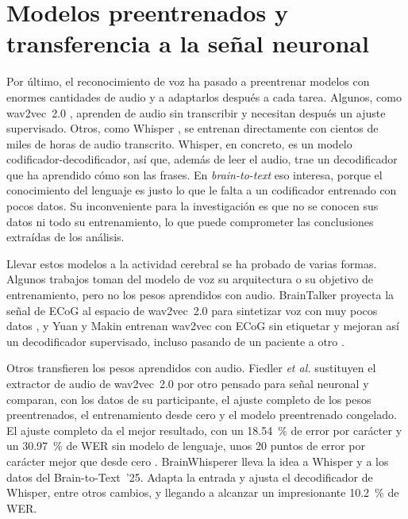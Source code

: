 \section{Modelos preentrenados y transferencia a la señal neuronal}
\label{sec:sota-habla}
\label{sec:sota-transferencia}

Por último, el reconocimiento de voz ha pasado a preentrenar modelos con enormes cantidades de audio y a adaptarlos después a cada tarea. Algunos, como wav2vec~2.0 \cite{baevski2020wav2vec}, aprenden de audio sin transcribir y necesitan después un ajuste supervisado. Otros, como Whisper \cite{radford2023whisper}, se entrenan directamente con cientos de miles de horas de audio transcrito. Whisper, en concreto, es un modelo codificador-decodificador, así que, además de leer el audio, trae un decodificador que ha aprendido cómo son las frases. En \textit{brain-to-text} eso interesa, porque el conocimiento del lenguaje es justo lo que le falta a un codificador entrenado con pocos datos. Su inconveniente para la investigación es que no se conocen sus datos ni todo su entrenamiento, lo que puede comprometer las conclusiones extraídas de los análisis. 


Llevar estos modelos a la actividad cerebral se ha probado de varias formas. Algunos trabajos toman del modelo de voz su arquitectura o su objetivo de entrenamiento, pero no los pesos aprendidos con audio. BrainTalker proyecta la señal de ECoG al espacio de wav2vec~2.0 para sintetizar voz con muy pocos datos \cite{braintalker}, y Yuan y Makin entrenan wav2vec con ECoG sin etiquetar y mejoran así un decodificador supervisado, incluso pasando de un paciente a otro \cite{ecogssl2024}.

Otros transfieren los pesos aprendidos con audio. Fiedler \textit{et al.} sustituyen el extractor de audio de wav2vec~2.0 por otro pensado para señal neuronal y comparan, con los datos de su participante, el ajuste completo de los pesos preentrenados, el entrenamiento desde cero y el modelo preentrenado congelado. El ajuste completo da el mejor resultado, con un \SI{18.54}{\percent} de error por carácter y un \SI{30.97}{\percent} de WER sin modelo de lenguaje, unos 20 puntos de error por carácter mejor que desde cero \cite{fiedler2025wav2vec2brain}. BrainWhisperer lleva la idea a Whisper y a los datos del Brain-to-Text~'25. Adapta la entrada y ajusta el decodificador de Whisper, entre otros cambios, y llegando a alcanzar un impresionante \SI{10.2}{\percent} de WER.

